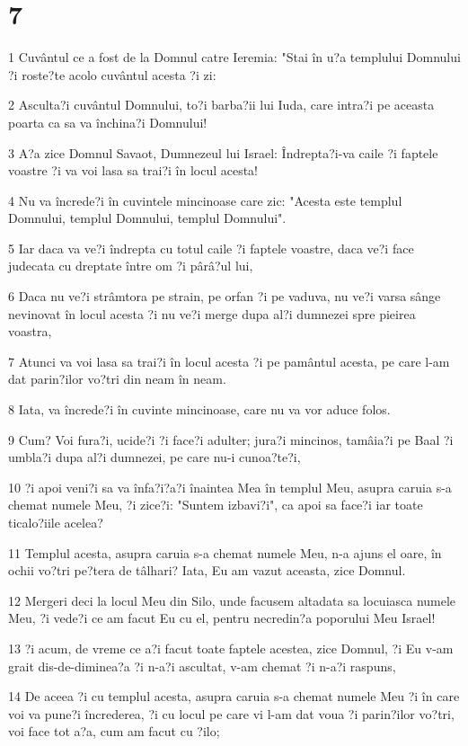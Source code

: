 \chapter{7}

\par 1 Cuvântul ce a fost de la Domnul catre Ieremia: "Stai în u?a templului Domnului ?i roste?te acolo cuvântul acesta ?i zi:
\par 2 Asculta?i cuvântul Domnului, to?i barba?ii lui Iuda, care intra?i pe aceasta poarta ca sa va închina?i Domnului!
\par 3 A?a zice Domnul Savaot, Dumnezeul lui Israel: Îndrepta?i-va caile ?i faptele voastre ?i va voi lasa sa trai?i în locul acesta!
\par 4 Nu va încrede?i în cuvintele mincinoase care zic: "Acesta este templul Domnului, templul Domnului, templul Domnului".
\par 5 Iar daca va ve?i îndrepta cu totul caile ?i faptele voastre, daca ve?i face judecata cu dreptate între om ?i pârâ?ul lui,
\par 6 Daca nu ve?i strâmtora pe strain, pe orfan ?i pe vaduva, nu ve?i varsa sânge nevinovat în locul acesta ?i nu ve?i merge dupa al?i dumnezei spre pieirea voastra,
\par 7 Atunci va voi lasa sa trai?i în locul acesta ?i pe pamântul acesta, pe care l-am dat parin?ilor vo?tri din neam în neam.
\par 8 Iata, va încrede?i în cuvinte mincinoase, care nu va vor aduce folos.
\par 9 Cum? Voi fura?i, ucide?i ?i face?i adulter; jura?i mincinos, tamâia?i pe Baal ?i umbla?i dupa al?i dumnezei, pe care nu-i cunoa?te?i,
\par 10 ?i apoi veni?i sa va înfa?i?a?i înaintea Mea în templul Meu, asupra caruia s-a chemat numele Meu, ?i zice?i: "Suntem izbavi?i", ca apoi sa face?i iar toate ticalo?iile acelea?
\par 11 Templul acesta, asupra caruia s-a chemat numele Meu, n-a ajuns el oare, în ochii vo?tri pe?tera de tâlhari? Iata, Eu am vazut aceasta, zice Domnul.
\par 12 Mergeri deci la locul Meu din Silo, unde facusem altadata sa locuiasca numele Meu, ?i vede?i ce am facut Eu cu el, pentru necredin?a poporului Meu Israel!
\par 13 ?i acum, de vreme ce a?i facut toate faptele acestea, zice Domnul, ?i Eu v-am grait dis-de-diminea?a ?i n-a?i ascultat, v-am chemat ?i n-a?i raspuns,
\par 14 De aceea ?i cu templul acesta, asupra caruia s-a chemat numele Meu ?i în care voi va pune?i încrederea, ?i cu locul pe care vi l-am dat voua ?i parin?ilor vo?tri, voi face tot a?a, cum am facut cu ?ilo;
